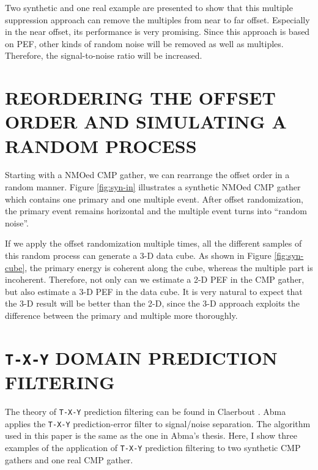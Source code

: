 Two synthetic and one real example are presented to show that this multiple 
suppression approach can remove the multiples from near to far offset.  
Especially in the near offset, its performance is very promising. Since this 
approach is based on PEF, other kinds of random noise will be removed as well 
as multiples. Therefore, the signal-to-noise ratio will be increased. 

\section{REORDERING THE OFFSET ORDER AND SIMULATING A RANDOM PROCESS}

Starting with a NMOed CMP gather, we can rearrange the offset order in a 
random manner.
Figure \ref{fig:syn-in} illustrates a synthetic NMOed CMP gather which 
contains one primary and one multiple event. After offset randomization, 
the primary event remains horizontal and the multiple event turns into 
``random noise''.


If we apply the offset randomization multiple times, all the different samples 
of this random 
process can generate a 3-D data cube. As shown in Figure \ref{fig:syn-cube}, 
the primary energy is coherent along the cube, whereas the multiple part is 
incoherent. Therefore, not only can we estimate a 2-D PEF in the CMP gather, 
but also estimate a 3-D PEF in the data cube. It is very natural to expect 
that the 3-D result will be better than the 2-D, since the 3-D approach 
exploits the difference between the primary and multiple more thoroughly. 



\section{{\tt T-X-Y} DOMAIN PREDICTION FILTERING}

The theory of {\tt T-X-Y} prediction filtering can be found in 
Claerbout . Abma  
applies the {\tt T-X-Y} prediction-error filter to signal/noise separation.  
The algorithm used in this paper is the same as the one in Abma's thesis. 
Here, I show three examples of the application of {\tt T-X-Y} 
prediction filtering to two synthetic CMP gathers and one real CMP gather.

